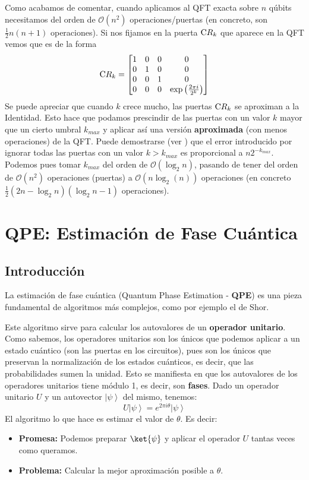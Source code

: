 \documentclass[a4paper,11pt]{book} %
\numberwithin{equation}{chapter}
\newcommand{\cg}[1]{{\rm C}#1}
\begin{document}
Como acabamos de comentar, cuando aplicamos al QFT exacta sobre $n$ qúbits necesitamos del orden de $\mathcal{O} (n^2)$ operaciones/puertas (en concreto, son $\frac{1}{2} n(n+1)$ operaciones). Si nos fijamos en la puerta $\cg{R_k}$ que aparece en la QFT vemos que es de la forma
	\begin{equation}
	\cg{R_k} = \left[ \begin{matrix}
	1 & 0 & 0 & 0 \\
	0 & 1 & 0 & 0 \\
	0 & 0 & 1 & 0 \\
	0 & 0 & 0 & \exp \left( \frac{2 \pi i}{2^k} \right)
	\end{matrix} \right]
	\end{equation}
Se puede apreciar que cuando $k$ crece mucho, las puertas $\cg{R_k}$ se aproximan a la Identidad. Esto hace que podamos prescindir de las puertas con un valor $k$ mayor que un cierto umbral $k_{max}$ y aplicar así una versión \textbf{aproximada} (con menos operaciones) de la QFT. Puede demostrarse (ver \cite{QFT-aprox}) que el error introducido por ignorar todas las puertas con un valor $k > k_{max}$ es proporcional a $n 2^{-k_{max}}$. Podemos pues tomar $k_{max}$ del orden de $\mathcal{O} (\log_2 n)$, pasando de tener del orden de $\mathcal{O} (n^2)$ operaciones (puertas) a $\mathcal{O} (n \log_2(n))$ operaciones (en concreto $\frac{1}{2} (2n-\log_2n)(\log_2n-1)$ operaciones).


\chapter{QPE: Estimación de Fase Cuántica} \label{chapter_QPE}


\section{Introducción}

La estimación de fase cuántica (Quantum Phase Estimation - \textbf{QPE}) es una pieza fundamental de algoritmos más complejos, como por ejemplo el de Shor. 

Este algoritmo sirve para calcular los autovalores de un \textbf{operador unitario}. Como sabemos, los operadores unitarios son los únicos que podemos aplicar a un estado cuántico (son las puertas en los circuitos), pues son los únicos que preservan la normalización de los estados cuánticos, es decir, que las probabilidades sumen la unidad. Esto se manifiesta en que los autovalores de los operadores unitarios tiene módulo 1, es decir, son \textbf{fases}. Dado un operador unitario $U$ y un autovector $\left| \psi \right\rangle$ del mismo, tenemos:
$$
U \left| \psi \right\rangle = e^{2 \pi i \theta} \left| \psi \right\rangle
$$
El algoritmo lo que hace es estimar el valor de $\theta$. Es decir:
\begin{itemize}
	\item \textbf{Promesa:} Podemos preparar $\ket{\psi}$ y aplicar el operador $U$ tantas veces como queramos.
	\item \textbf{Problema:} Calcular la mejor aproximación posible a $\theta$.
\end{itemize}
\end{document}
